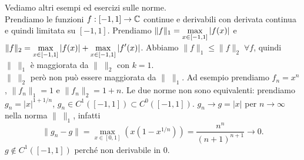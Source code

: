Vediamo altri esempi ed esercizi sulle norme.\\
Prendiamo le funzioni $f: [-1, 1] \to \mathbb C$ continue e derivabili con
derivata continua e quindi limitata su $[-1, 1]$.
Prendiamo $ \displaystyle \|f\|_1 = \max_{x \in [-1, 1]} {\left|f(x)\right|}$ e $ \displaystyle
\|f\|_2 = \max_{x \in [-1, 1]} {\left|f(x)\right|} + \max_{x \in [-1, 1]} {\left|f'(x)\right|}$.
Abbiamo $\|f\|_1 \leq \|f\|_2 \; \forall f$, quindi $\| \; \|_1$ è maggiorata
da $\| \; \|_2$ con $k = 1$.\\
$\| \; \|_2$ però non può essere maggiorata da $\| \; \|_1$.
Ad esempio prendiamo $f_n = x^n$, $\|f_n\|_1 = 1$ e $\|f_n\|_2= 1 + n$.
Le due norme non sono equivalenti: prendiamo $g_n=|x|^{1+1/n}$,
$g_n\in C^1([-1, 1]) \subset C^0([-1, 1])$. $g_n \to g = |x|$ 
per $n \to \infty$ nella norma $\| \; \|_1$, infatti
\[
\|g_n - g\| = \max_{x \in [0,1] }(x(1 - x^{1/n})) = \frac{n^n}
{(n+1)^{n+1}} \to 0
.\]
$g \notin C^1([-1, 1])$ perché non derivabile in $0$.


